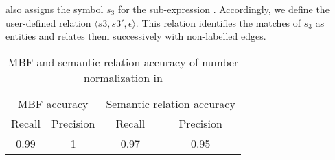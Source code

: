 \begin{appendices}
\framework also assigns the symbol $s_3$ for the sub-expression . 
Accordingly, we define the user-defined relation $\langle s3,s3',\epsilon\rangle$. 
This relation identifies the matches of $s_3$ as entities and relates them successively with non-labelled edges.

\begin{table}[tb!]
  \centering
  \caption{MBF and semantic relation accuracy of number normalization in \framework}
    \begin{tabular}{c|c|c|c}
     \toprule
     \multicolumn{2}{c|}{MBF accuracy} & \multicolumn{2}{c}{Semantic relation accuracy}\\
     Recall & Precision & Recall & Precision \\
    \midrule
    0.99 & 1 & 0.97 & 0.95 \\
    \bottomrule
    \end{tabular}%
  \label{tab:nnmbfer}%
\end{table}%

\begin{table}[tb!]
  \centering
  \caption{\framework~against NUMNORM: Time, accuracy, and ease of composition}
  \label{tab:nnresults}%
\end{table}%


\end{appendices}
